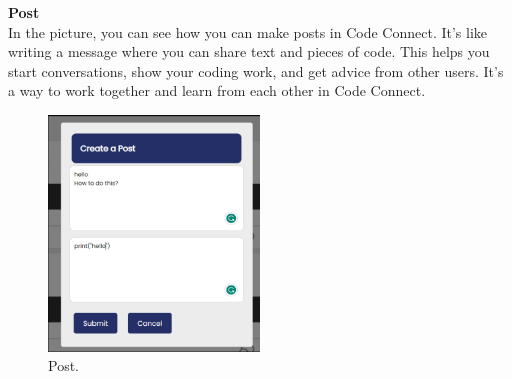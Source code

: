 \textbf{Post}
\\In the picture, you can see how you can make posts in Code Connect. It's like writing a message where you can share text and pieces of code. This helps you start conversations, show your coding work, and get advice from other users. It's a way to work together and learn from each other in Code Connect.
\begin{figure}[ht]
    \centering
    \includegraphics[width=0.5\textwidth]{Outcome-ss/post.png}
    \caption{Post.}
    \label{fig:Post}
\end{figure}

